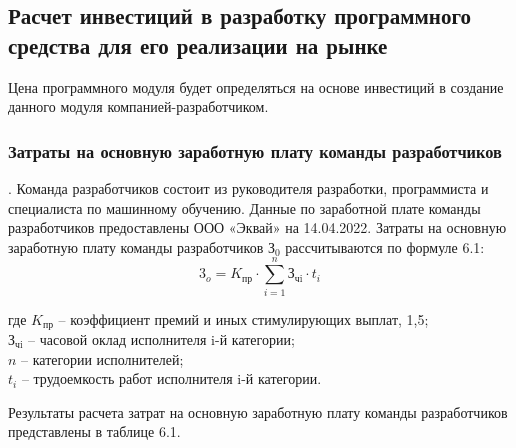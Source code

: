 \subsection{Расчет инвестиций в разработку программного средства для его реализации на рынке}

Цена программного модуля будет определяться на основе инвестиций в создание данного модуля компанией-разработчиком.

\subsubsection{Затраты на основную заработную плату команды разработчиков}. Команда разработчиков состоит из руководителя разработки, программиста и специалиста по машинному обучению.
Данные по заработной плате команды разработчиков предоставлены ООО «Эквай» на 14.04.2022.
Затраты на основную заработную плату команды разработчиков $\text{З}_0$ рассчитываются по формуле 6.1:
\begin{equation}
	\text{3}_o = K_{\text{пр}} \cdot \sum_{i=1}^{n}{\text{З}_{\text{чi}} \cdot t_i}
\end{equation}
\begin{explanation}
	где $K_{\text{пр}}$ – коэффициент премий и иных стимулирующих выплат, 1,5; \\
	$\text{З}_{\text{чi}}$ – часовой оклад исполнителя i-й категории; \\
	$n$ – категории исполнителей; \\
	$t_i$ – трудоемкость работ исполнителя i-й категории.
\end{explanation}

Результаты расчета затрат на основную заработную плату команды разработчиков представлены в таблице 6.1.

